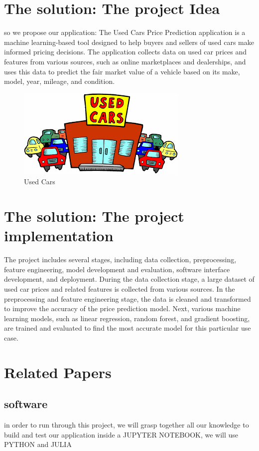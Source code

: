 \documentclass[]{report}   %
\begin{document}
\section{The solution: The project Idea}    %
so we propose our application:
The Used Cars Price Prediction application is a machine learning-based tool designed to help buyers and sellers of used cars make informed pricing decisions.
The application collects data on used car prices and features from various sources, such as online marketplaces and dealerships, and uses this data to predict the fair market value of a vehicle 
based on its make, model, year, mileage, and condition.
\begin{figure}[H]
\centering
\includegraphics[width = 0.5 \linewidth]{used_cars.jpg}
\caption{Used Cars} \label{exemple-ref-img}
\end{figure}
  

\section{The solution: The project implementation}    %
The project includes several stages, including data collection, preprocessing, feature engineering, model development and evaluation, software interface development, and deployment.
During the data collection stage, a large dataset of used car prices and related features is collected from various sources.
In the preprocessing and feature engineering stage, the data is cleaned and transformed to improve the accuracy of the price prediction model.
Next, various machine learning models, such as linear regression, random forest, and gradient boosting, are trained and evaluated to find the most accurate model for this particular use case. 
\section{Related Papers}     %
\subsection{software}
in order to run through this project, we will grasp together all our knowledge to build and test our application inside a JUPYTER NOTEBOOK, we will use PYTHON and JULIA
\end{document}
